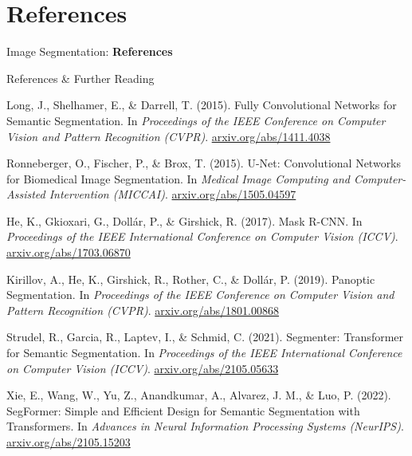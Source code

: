 \section{References}
\begin{frame}{}
    \LARGE Image Segmentation: \textbf{References}
\end{frame}

\begin{frame}[allowframebreaks]{References \& Further Reading}
    \begin{thebibliography}{9}
        Long, J., Shelhamer, E., \& Darrell, T. (2015). 
        \newblock Fully Convolutional Networks for Semantic Segmentation.
        \newblock In \emph{Proceedings of the IEEE Conference on Computer Vision and Pattern Recognition (CVPR)}.
        \newblock \href{https://arxiv.org/abs/1411.4038}{arxiv.org/abs/1411.4038}

        Ronneberger, O., Fischer, P., \& Brox, T. (2015).
        \newblock U-Net: Convolutional Networks for Biomedical Image Segmentation.
        \newblock In \emph{Medical Image Computing and Computer-Assisted Intervention (MICCAI)}.
        \newblock \href{https://arxiv.org/abs/1505.04597}{arxiv.org/abs/1505.04597}

        He, K., Gkioxari, G., Dollár, P., \& Girshick, R. (2017).
        \newblock Mask R-CNN.
        \newblock In \emph{Proceedings of the IEEE International Conference on Computer Vision (ICCV)}.
        \newblock \href{https://arxiv.org/abs/1703.06870}{arxiv.org/abs/1703.06870}

        Kirillov, A., He, K., Girshick, R., Rother, C., \& Dollár, P. (2019).
        \newblock Panoptic Segmentation.
        \newblock In \emph{Proceedings of the IEEE Conference on Computer Vision and Pattern Recognition (CVPR)}.
        \newblock \href{https://arxiv.org/abs/1801.00868}{arxiv.org/abs/1801.00868}

        Strudel, R., Garcia, R., Laptev, I., \& Schmid, C. (2021).
        \newblock Segmenter: Transformer for Semantic Segmentation.
        \newblock In \emph{Proceedings of the IEEE International Conference on Computer Vision (ICCV)}.
        \newblock \href{https://arxiv.org/abs/2105.05633}{arxiv.org/abs/2105.05633}

        Xie, E., Wang, W., Yu, Z., Anandkumar, A., Alvarez, J. M., \& Luo, P. (2022).
        \newblock SegFormer: Simple and Efficient Design for Semantic Segmentation with Transformers.
        \newblock In \emph{Advances in Neural Information Processing Systems (NeurIPS)}.
        \newblock \href{https://arxiv.org/abs/2105.15203}{arxiv.org/abs/2105.15203}
    \end{thebibliography}


\end{frame}
